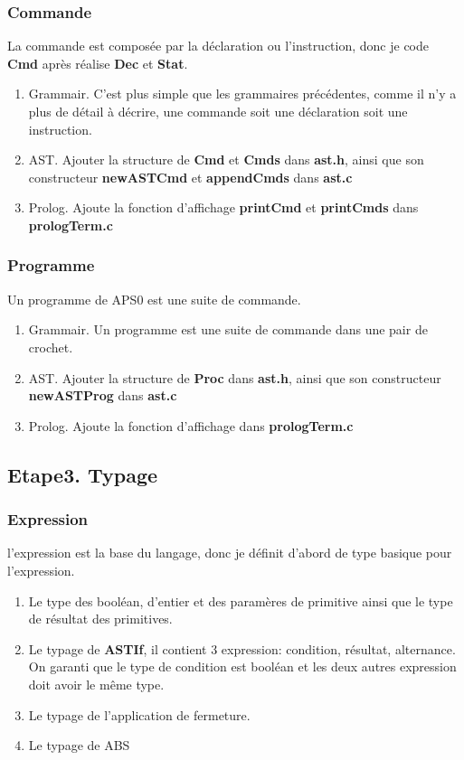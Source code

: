 \documentclass[14px]{article}
\begin{document}
\subsubsection{Commande}
La commande est composée par la déclaration ou l'instruction, donc je code \textbf{Cmd} après réalise \textbf{Dec} et \textbf{Stat}.
\begin{enumerate}
	\item  Grammair. C'est plus simple que les grammaires précédentes, comme il n'y a plus de détail à décrire, une commande soit une déclaration soit une instruction.
	\item AST. Ajouter la structure de \textbf{Cmd} et \textbf{Cmds} dans \textbf{ast.h}, ainsi que son constructeur \textbf{newASTCmd} et \textbf{appendCmds} dans \textbf{ast.c}
	\item Prolog. Ajoute la fonction d'affichage \textbf{printCmd} et \textbf{printCmds} dans \textbf{prologTerm.c}
\end{enumerate}

\subsubsection{Programme}
Un programme de APS0 est une suite de commande.
\begin{enumerate}
	\item  Grammair. Un programme est une suite de commande dans une pair de crochet.
	\item AST. Ajouter la structure de \textbf{Proc} dans \textbf{ast.h}, ainsi que son constructeur \textbf{newASTProg} dans \textbf{ast.c}
	\item Prolog. Ajoute la fonction d'affichage  dans \textbf{prologTerm.c}
\end{enumerate}

\subsection{Etape3. Typage}
\subsubsection{Expression}
l'expression est la base du langage, donc je définit d'abord de type basique pour l'expression.
\begin{enumerate}
\item Le type des booléan, d'entier et des paramères de primitive ainsi que le type de résultat des primitives.
\item Le typage de \textbf{ASTIf}, il contient 3 expression: condition, résultat, alternance.
On garanti que le type de condition est booléan et les deux autres expression doit avoir le même type.
\item Le typage de l'application de fermeture.
\item Le typage de ABS
\end{enumerate}
\end{document}
